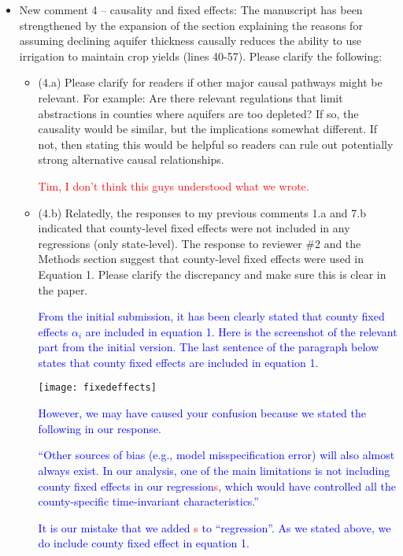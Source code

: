 \documentclass[
]{article}
\begin{document}
\begin{itemize}
\item New comment 4 – causality and fixed effects: The manuscript has been strengthened by the expansion of the section explaining the reasons for assuming declining aquifer thickness causally reduces the ability to use irrigation to maintain crop yields (lines 40-57). Please clarify the following:

  \begin{itemize}
  \item (4.a) Please clarify for readers if other major causal pathways might be relevant. For example: Are there relevant regulations that limit abstractions in counties where aquifers are too depleted? If so, the causality would be similar, but the implications somewhat different. If not, then stating this would be helpful so readers can rule out potentially strong alternative causal relationships.

  \textcolor{red}{Tim, I don't think this guys understood what we wrote.}
  
  \item (4.b) Relatedly, the responses to my previous comments 1.a and 7.b indicated that county-level fixed effects were not included in any regressions (only state-level). The response to reviewer \#2 and the Methods section suggest that county-level fixed effects were used in Equation 1. Please clarify the discrepancy and make sure this is clear in the paper.

  \textcolor{blue}{From the initial submission, it has been clearly stated that county fixed effects $\alpha_i$ are included in equation 1. Here is the screenshot of the relevant part from the initial version. The last sentence of the paragraph below states that county fixed effects are included in equation 1.}
  
  \texttt{[image: fixedeffects]}

  \textcolor{blue}{However, we may have caused your confusion because we stated the following in our response.}

  \textcolor{blue}{``Other sources of bias (e.g., model misspecification error) will also almost always exist. In our analysis, one of the main limitations is not including county fixed effects in our regression\textcolor{red}{s}, which would have controlled all the county-specific time-invariant characteristics.''}

  \textcolor{blue}{It is our mistake that we added \textcolor{red}{s} to ``regression''. As we stated above, we do include county fixed effect in equation 1. }
  

\end{itemize}
\end{itemize}
\end{document}
